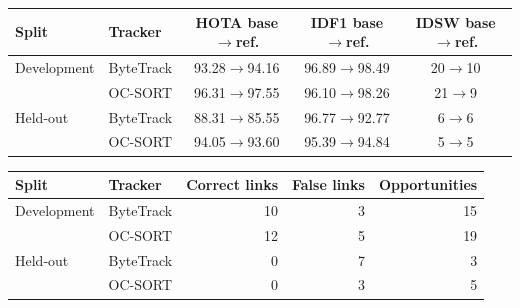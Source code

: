 \begin{tabular}{llccc}
\toprule
Split & Tracker & HOTA base$\rightarrow$ref. & IDF1 base$\rightarrow$ref. & IDSW base$\rightarrow$ref. \\
\midrule
Development & ByteTrack & 93.28$\rightarrow$94.16 & 96.89$\rightarrow$98.49 & 20$\rightarrow$10 \\
 & OC-SORT & 96.31$\rightarrow$97.55 & 96.10$\rightarrow$98.26 & 21$\rightarrow$9 \\
\midrule
Held-out & ByteTrack & 88.31$\rightarrow$85.55 & 96.77$\rightarrow$92.77 & 6$\rightarrow$6 \\
 & OC-SORT & 94.05$\rightarrow$93.60 & 95.39$\rightarrow$94.84 & 5$\rightarrow$5 \\
\bottomrule
\end{tabular}
\par\smallskip
\begin{tabular}{llrrr}
\toprule
Split & Tracker & Correct links & False links & Opportunities \\
\midrule
Development & ByteTrack & 10 & 3 & 15 \\
 & OC-SORT & 12 & 5 & 19 \\
\midrule
Held-out & ByteTrack & 0 & 7 & 3 \\
 & OC-SORT & 0 & 3 & 5 \\
\bottomrule
\end{tabular}
